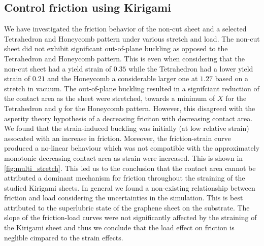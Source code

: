 \subsection{Control friction using Kirigami}
We have investigated the friction behavior of the non-cut sheet and a selected
Tetrahedron and Honeycomb pattern under various stretch and load. The non-cut
sheet did not exhibit significant out-of-plane buckling as opposed to the
Tetrahedron and Honeycomb pattern. This is even when considering that the
non-cut sheet had a yield strain of $0.35$ while the Tetrahedron had a lower
yield strain of $0.21$ and the Honeycomb a considerable larger one at $1.27$
based on a stretch in vacuum. The out-of-plane buckling resulted in a
signifciant reduction of the contact area as the sheet were stretched, towards a
minimum of $X$ for the Tetrahedron and $y$ for the Honeycomb pattern. However,
this disagreed with the asperity theory hypothesis of a decreasing friciton with
decreasing contact area. We found that the strain-induced buckling was initially
(at low relative strain) assocated with an increase in friction. Moreover, the
friction-strain curve produced a no-linear behaviour which was not compatible
with the approximately monotonic decreasing contact area as strain were
increased. This is shown in \cref{fig:multi_stretch}.  This led us to the conclusion that the contact area cannot be attributed a dominant mechanism for friction throughout the straining of the studied Kirigami sheets. In general we found a non-existing relationship between friction and load considering the uncertainties in the simulation. This is best attributed to the superlubric state of the graphene sheet on the substrate. The slope of the friction-load curves were not significantly affected by the straining of the Kirigami sheet and thus we conclude that the load effect on friction is neglible cimpared to the strain effects. 



